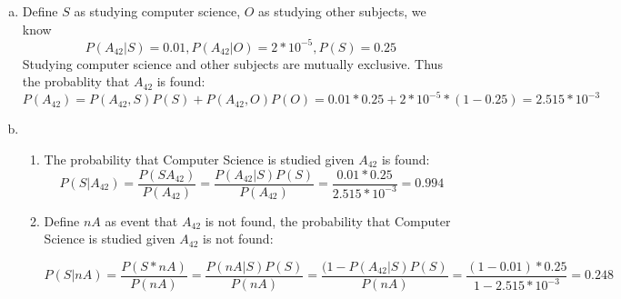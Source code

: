 \documentclass[]{book}
\theoremstyle{definition}
\begin{document}
\begin{enumerate}[(a)]
	\item Define $S$ as studying computer science, $O$ as studying other subjects, we know
	$$P(A_{42}|S) = 0.01, P(A_{42}|O) = 2* 10^{-5}, P(S) = 0.25  $$
	Studying computer science and other subjects are mutually exclusive. Thus the probablity that $A_{42}$ is found:
	$$P(A_{42}) = P(A_{42},S)P(S) + P(A_{42},O)P(O) = 0.01 * 0.25 +  2* 10^{-5} * (1- 0.25) = 2.515 * 10^{-3} $$
	
	\item 
	  \begin{enumerate}[(1)]
	  	\item The probability that Computer Science is studied given $A_{42}$ is found: 
	  	 $$P(S|A_{42})= \frac{P(SA_{42})}{P(A_{42})} = \frac{P(A_{42}|S)P(S)}{P(A_{42})} = \frac{0.01*0.25}{2.515 * 10^{-3}} = 0.994$$
	  	\item Define $nA$ as event that $A_{42}$ is not found, the probability that Computer Science is studied given $A_{42}$ is not found: 
	  	
	  	 $$P(S|nA)= \frac{P(S*nA)}{P(nA)} = \frac{P(nA|S)P(S)}{P(nA)} = \frac{(1-P(A_{42}|S)P(S)}{P(nA)} = \frac{(1-0.01)*0.25}{1-2.515 * 10^{-3}} = 0.248$$	  	
	  \end{enumerate}	 
\end{enumerate}
\end{document}
